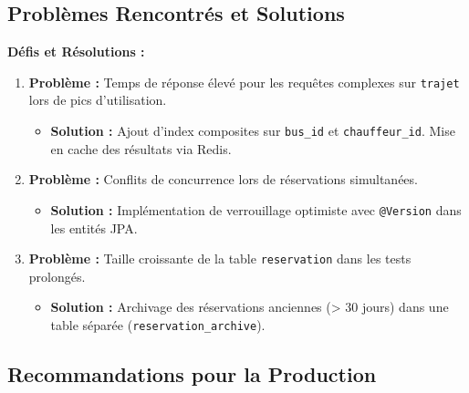 \documentclass[12pt,a4paper]{article}
\begin{document}
\subsection{Problèmes Rencontrés et Solutions}

\begin{warningbox}
\textbf{Défis et Résolutions :}

\begin{enumerate}
\item \textbf{Problème :} Temps de réponse élevé pour les requêtes complexes sur \texttt{trajet} lors de pics d'utilisation.
\begin{itemize}
\item \textbf{Solution :} Ajout d'index composites sur \texttt{bus_id} et \texttt{chauffeur_id}. Mise en cache des résultats via Redis.
\end{itemize}

\item \textbf{Problème :} Conflits de concurrence lors de réservations simultanées.
\begin{itemize}
\item \textbf{Solution :} Implémentation de verrouillage optimiste avec \texttt{@Version} dans les entités JPA.
\end{itemize}

\item \textbf{Problème :} Taille croissante de la table \texttt{reservation} dans les tests prolongés.
\begin{itemize}
\item \textbf{Solution :} Archivage des réservations anciennes (> 30 jours) dans une table séparée (\texttt{reservation_archive}).
\end{itemize}
\end{enumerate}
\end{warningbox}

\subsection{Recommandations pour la Production}
\end{document}
